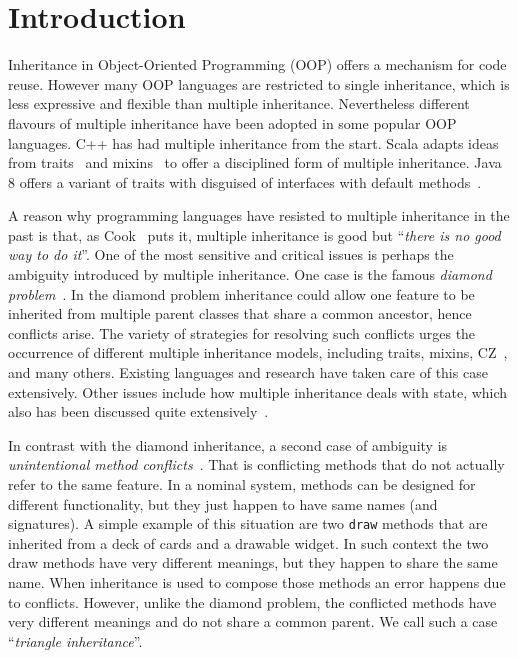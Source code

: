 \section{Introduction}
Inheritance in Object-Oriented Programming (OOP) offers a mechanism
for code reuse. However many OOP languages are restricted to single
inheritance, which is less expressive and flexible than multiple
inheritance. Nevertheless different flavours of multiple inheritance
have been adopted in some popular OOP languages. C++ has had 
multiple inheritance from the start. Scala adapts ideas from traits~\cite{scharli03traits} 
and mixins~\cite{bracha90mixin} to offer a disciplined form of multiple inheritance. Java 8 
offers a variant of traits with disguised of interfaces with default methods~\cite{goetz12fdefenders}.

A reason why programming languages have resisted to multiple
inheritance in the past is that, as Cook~\cite{Cook1987} puts it, 
multiple inheritance is good but ``\emph{there is no good way to do it}''.
One of the most sensitive and critical issues is perhaps the ambiguity
introduced by multiple inheritance. One case is the famous
\textit{diamond problem}~\cite{Sak89dis,Singh1995}. In the diamond problem inheritance could allow
one feature to be inherited from multiple parent classes that share a
common ancestor, hence
conflicts arise. The variety of strategies for resolving such conflicts
urges the occurrence of different multiple inheritance models,
including traits, mixins, CZ~\cite{malayeri2009cz}, and many others. Existing
languages and research have taken care of this case extensively. Other issues
include how multiple inheritance deals with state, 
which also has been discussed quite extensively~\cite{classless,malayeri2009cz,stroustrup1995}.

In contrast with the diamond inheritance, a second case of ambiguity
is \textit{unintentional method conflicts}~\cite{scharli03traits}. That is conflicting 
methods that do not actually refer to the same feature. 
In a nominal system, methods can be designed for different
functionality, but they just happen to have same names (and
signatures).
A simple example of this situation are two \lstinline{draw} methods that
are inherited from a deck of cards and a drawable widget. 
In such context the two draw methods have very different meanings, 
but they happen to share the same name.
When inheritance is used to compose those methods an
error happens due to conflicts. However, unlike the diamond problem,
the conflicted methods have very different meanings and do not share a
common parent. We call such a case ``\textit{triangle inheritance}''.

